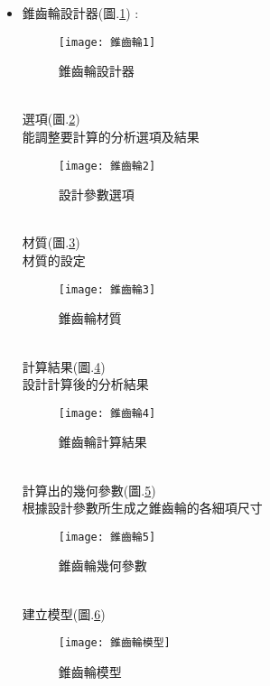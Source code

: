 \begin{itemize}
	\item 錐齒輪設計器(圖.\ref{2.25}) :\\
		\begin{figure}[hbt!]
		\begin{center}
		\texttt{[image: 錐齒輪1]}
		\caption{\Large 錐齒輪設計器}\label{2.25}
		\end{center}
		\end{figure}
		\\
		選項(圖.\ref{2.26}) \\
		能調整要計算的分析選項及結果\\
		\begin{figure}[hbt!]
		\begin{center}
		\texttt{[image: 錐齒輪2]}
		\caption{\Large 設計參數選項}\label{2.26}
		\end{center}
		\end{figure}
		\\
		材質(圖.\ref{2.27}) \\
		材質的設定\\
		\begin{figure}[hbt!]
		\begin{center}
		\texttt{[image: 錐齒輪3]}
		\caption{\Large 錐齒輪材質}\label{2.27}
		\end{center}
		\end{figure}
		\\
		計算結果(圖.\ref{2.28}) \\
		設計計算後的分析結果\\
		\begin{figure}[hbt!]
		\begin{center}
		\texttt{[image: 錐齒輪4]}
		\caption{\Large 錐齒輪計算結果}\label{2.28}
		\end{center}
		\end{figure}
		\\
		計算出的幾何參數(圖.\ref{2.29}) \\
		根據設計參數所生成之錐齒輪的各細項尺寸\\
		\begin{figure}[hbt!]
		\begin{center}
		\texttt{[image: 錐齒輪5]}
		\caption{\Large 錐齒輪幾何參數}\label{2.29}
		\end{center}
		\end{figure}
		\\
		建立模型(圖.\ref{2.228}) \\
		\begin{figure}[hbt!]
		\begin{center}
		\texttt{[image: 錐齒輪模型]}
		\caption{\Large 錐齒輪模型}\label{2.228}
		\end{center}
		\end{figure}
		\\
	

\end{itemize}
